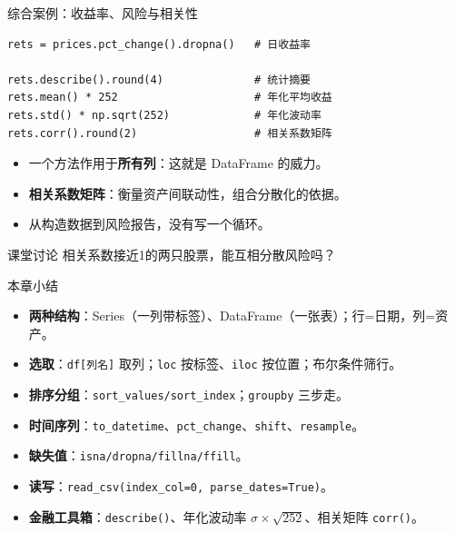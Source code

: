 \documentclass[9pt]{ctexbeamer}
\begin{document}
\begin{frame}[fragile]{综合案例：收益率、风险与相关性}
	\begin{lstlisting}
rets = prices.pct_change().dropna()   # 日收益率

rets.describe().round(4)              # 统计摘要
rets.mean() * 252                     # 年化平均收益
rets.std() * np.sqrt(252)             # 年化波动率
rets.corr().round(2)                  # 相关系数矩阵
\end{lstlisting}
	\begin{itemize}
		\item 一个方法作用于\textbf{所有列}：这就是 DataFrame 的威力。
		\item \textbf{相关系数矩阵}：衡量资产间联动性，组合分散化的依据。
		\item 从构造数据到风险报告，没有写一个循环。
	\end{itemize}
	\begin{exampleblock}{课堂讨论}
		相关系数接近1的两只股票，能互相分散风险吗？
	\end{exampleblock}
\end{frame}

\begin{frame}{本章小结}
	\begin{itemize}
		\item \textbf{两种结构}：Series（一列带标签）、DataFrame（一张表）；\alert{行=日期，列=资产}。
		\item \textbf{选取}：\texttt{df[列名]} 取列；\texttt{loc} 按标签、\texttt{iloc} 按位置；布尔条件筛行。
		\item \textbf{排序分组}：\texttt{sort\_values/sort\_index}；\texttt{groupby} 三步走。
		\item \textbf{时间序列}：\texttt{to\_datetime}、\texttt{pct\_change}、\texttt{shift}、\texttt{resample}。
		\item \textbf{缺失值}：\texttt{isna/dropna/fillna/ffill}。
		\item \textbf{读写}：\texttt{read\_csv(index\_col=0, parse\_dates=True)}。
		\item \textbf{金融工具箱}：\texttt{describe()}、年化波动率 $\sigma\times\sqrt{252}$、相关矩阵 \texttt{corr()}。
	\end{itemize}
\end{frame}
\end{document}
